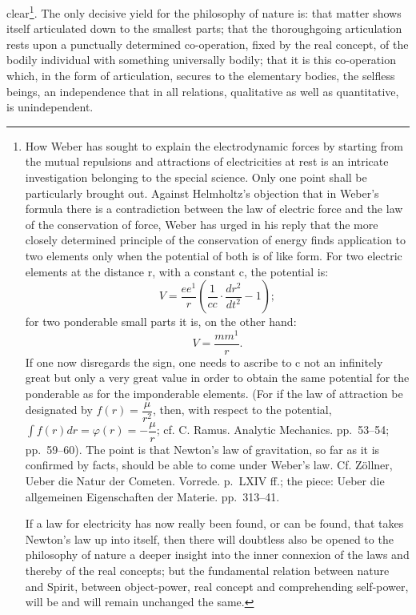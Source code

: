 \documentclass[12pt,a4paper]{book}
\begin{document}
clear\footnote{%
How Weber has sought to explain the electrodynamic forces by starting from the mutual repulsions and attractions of
electricities at rest is an intricate investigation belonging to the special science. Only one point shall be
particularly brought out. Against Helmholtz's objection that in Weber's formula there is a contradiction between the law
of electric force and the law of the conservation of force, Weber has urged in his reply that the more closely determined
principle of the conservation of energy finds application to two elements only when the potential of both is of like
form. For two electric elements at the distance r, with a constant c, the potential is:
\[
V = \frac{ee^{1}}{r}\left(\frac{1}{cc}\cdot\frac{dr^{2}}{dt^{2}} - 1\right);
\]
for two ponderable small parts it is, on the other hand:
\[
V = \frac{mm^{1}}{r}.
\]
If one now disregards the sign, one needs to ascribe to c not an infinitely great but only a very great value in order to
obtain the same potential for the ponderable as for the imponderable elements. (For if the law of attraction be
designated by $f(r) = \dfrac{\mu}{r^{2}}$, then, with respect to the
potential, $\int f(r)dr = \varphi(r) = - \dfrac{\mu}{r}$; cf. C. Ramus. Analytic Mechanics. pp.\ 53--54; pp.\ 59--60).
The point is that Newton's law of gravitation, so far as it is confirmed by facts, should be able to come under Weber's
law. Cf. Zöllner, Ueber die Natur der Cometen. Vorrede. p.\ LXIV ff.; the piece: Ueber die allgemeinen Eigenschaften der
Materie. pp.\ 313--41.

If a law for electricity has now really been found, or can be found, that takes Newton's law up into itself, then there
will doubtless also be opened to the philosophy of nature a deeper insight into the inner connexion of the laws and
thereby of the real concepts; but the fundamental relation between nature and
Spirit, between object-power, real concept and comprehending self-power, will be and will remain unchanged the same.}.
The only decisive yield for the philosophy of
nature is: that matter shows itself articulated down to the smallest parts; that the thoroughgoing articulation rests
upon a punctually determined co-operation, fixed by the real concept, of the bodily individual with something universally
bodily; that it is this co-operation which, in the form of articulation, secures to the elementary bodies, the selfless
beings, an independence that in all relations, qualitative as well as quantitative, is unindependent.
\end{document}

